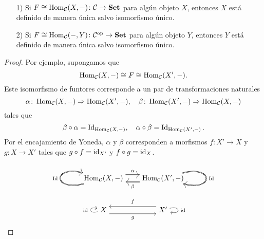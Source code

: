 \documentclass{article}
\numberwithin{equation}{section}
\theoremstyle{definition}
\begin{document}
\begin{corolario}
  \label{funtores-representados-objeto-unico-salvo-iso}
  ~

  \begin{enumerate}
  \item[1)] Si $F \cong \operatorname{Hom}_\mathcal{C} (X,-)\colon \mathcal{C} \to \text{\bf Set}$
    para algún objeto $X$, entonces $X$ está definido de manera única salvo
    isomorfismo único.

  \item[2)] Si
    $F \cong \operatorname{Hom}_\mathcal{C} (-,Y)\colon \mathcal{C}^\mathrm{op} \to \text{\bf Set}$
    para algún objeto $Y$, entonces $Y$ está definido de manera única salvo
    isomorfismo único.
  \end{enumerate}

  \begin{proof}
    Por ejemplo, supongamos que
    $$\operatorname{Hom}_\mathcal{C} (X,-) \cong F \cong \operatorname{Hom}_\mathcal{C} (X',-).$$
    Este isomorfismo de funtores corresponde a un par de transformaciones naturales
    \[ \alpha\colon \operatorname{Hom}_\mathcal{C} (X,-) \Rightarrow \operatorname{Hom}_\mathcal{C} (X',-), \quad
      \beta\colon \operatorname{Hom}_\mathcal{C} (X',-) \Rightarrow \operatorname{Hom}_\mathcal{C} (X,-) \]
    tales que
    \[ \beta\circ\alpha = \operatorname{Id}_{\operatorname{Hom}_\mathcal{C} (X,-)}, \quad
      \alpha\circ\beta = \operatorname{Id}_{\operatorname{Hom}_\mathcal{C} (X',-)}. \]
    Por el encajamiento de Yoneda, $\alpha$ y $\beta$ corresponden a morfismos
    $f\colon X'\to X$ y $g\colon X \to X'$ tales que $g\circ f = \mathrm{id}_{X'}$ y
    $f\circ g = \mathrm{id}_{X}$.

    \[ \begin{tikzpicture}
        \matrix(m)[matrix of math nodes, row sep=3em, column sep=2em, text height=1.5ex, text depth=0.25ex]
        {\Hom_\vcateg{C} (X,-) & \Hom_\vcateg{C} (X',-)\\
          X & X'\\};

        \draw[->] (m-1-1) edge[double,loop left] node[left,font=\scriptsize] {$\Id$} (m-1-1);
        \draw[->] (m-1-2) edge[double,loop right] node[right,font=\scriptsize] {$\Id$} (m-1-2);

        \draw[double,->] ([yshift=0.5em]m-1-1.east) -- node[above,font=\scriptsize] {$\alpha$} ([yshift=0.5em]m-1-2.west);
        \draw[double,->] ([yshift=-0.5em]m-1-2.west) -- node[below,font=\scriptsize] {$\beta$} ([yshift=-0.5em]m-1-1.east);

        \draw[double,->] (m-2-1) edge[loop left] node[left,font=\scriptsize] {$\idid$} (m-2-1);
        \draw[double,->] (m-2-2) edge[loop right] node[right,font=\scriptsize] {$\idid$} (m-2-2);

        \draw[<-] ([yshift=0.5em]m-2-1.east) -- node[above,font=\scriptsize] {$f$} ([yshift=0.5em]m-2-2.west);
        \draw[<-] ([yshift=-0.5em]m-2-2.west) -- node[below,font=\scriptsize] {$g$} ([yshift=-0.5em]m-2-1.east);
      \end{tikzpicture} \qedhere \]
  \end{proof}
\end{corolario}
\end{document}
